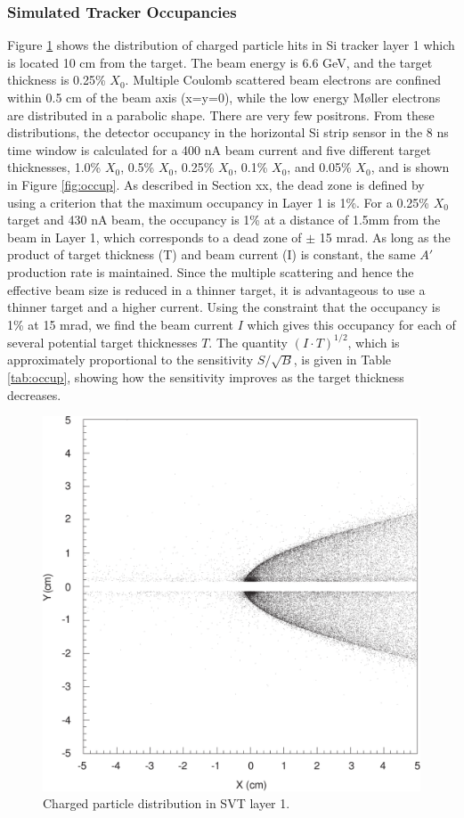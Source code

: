 \subsubsection{Simulated Tracker Occupancies}

Figure \ref{fig:scatt} shows the distribution of charged particle hits in Si tracker layer 1 
which is located 
10 cm from the target. The beam energy is 6.6 GeV, and the target thickness is 
0.25\% $X_0$. Multiple Coulomb scattered beam electrons are confined within 0.5 cm of the beam axis
(x=y=0), while the low energy M{\o}ller electrons are distributed in a parabolic shape. There are
very few positrons. From these distributions, the detector occupancy in the horizontal Si strip
sensor in the 8 ns time window is calculated for a 400 nA beam current and five different target
thicknesses, 1.0\% $X_0$, 0.5\% $X_0$, 0.25\% $X_0$, 0.1\% $X_0$, and 0.05\% $X_0$, and is shown
in Figure \ref{fig:occup}. As described in Section xx, the dead zone is defined by using 
a criterion that the
maximum occupancy in Layer 1 is 1\%. For a 0.25\% $X_0$ target and 430 nA beam, the occupancy is 
1\% at a distance of 1.5mm from the beam in Layer 1, which corresponds to a dead zone of $\pm$ 15
mrad. As long as the product of target thickness (T) and beam current (I) is constant, the same 
$A'$ production rate is maintained. Since the multiple scattering and hence the effective beam size 
is reduced in a thinner target, it is advantageous to use a thinner target and a higher current.
Using the constraint that the occupancy is 1\% at 15 mrad, we find the beam current $I$ which 
gives this occupancy for each of several potential target thicknesses $T$. The quantity 
$(I\cdot T)^{1/2}$, which is approximately proportional to the sensitivity $S/\sqrt{B}$, is
given in Table \ref{tab:occup}, showing how the sensitivity improves as the target thickness 
decreases.

\begin{figure}[h]
\includegraphics[width= 4 in]{performance/scatterplot.pdf}
\caption{\small{Charged particle distribution in SVT layer 1.}}
\label{fig:scatt}
\end{figure}

